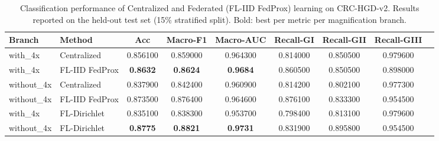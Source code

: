 \begin{table}
\caption{Classification performance of Centralized and Federated (FL-IID FedProx) learning on CRC-HGD-v2. Results reported on the held-out test set (15\% stratified split). Bold: best per metric per magnification branch.}
\label{tab:colon5_results}
\begin{tabular}{llccccccc}
\toprule
Branch & Method & Acc & Macro-F1 & Macro-AUC & Recall-GI & Recall-GII & Recall-GIII \\
\midrule
with_4x & Centralized & 0.856100 & 0.859000 & 0.964300 & 0.814000 & 0.850500 & 0.979600 \\
with_4x & FL-IID FedProx & \textbf{0.8632} & \textbf{0.8624} & \textbf{0.9684} & 0.860500 & 0.850500 & 0.898000 \\
without_4x & Centralized & 0.837900 & 0.842400 & 0.960900 & 0.814200 & 0.802100 & 0.977300 \\
without_4x & FL-IID FedProx & 0.873500 & 0.876400 & 0.964600 & 0.876100 & 0.833300 & 0.954500 \\
with_4x & FL-Dirichlet & 0.835100 & 0.838300 & 0.953700 & 0.798400 & 0.813100 & 0.979600 \\
without_4x & FL-Dirichlet & \textbf{0.8775} & \textbf{0.8821} & \textbf{0.9731} & 0.831900 & 0.895800 & 0.954500 \\
\bottomrule
\end{tabular}
\end{table}

